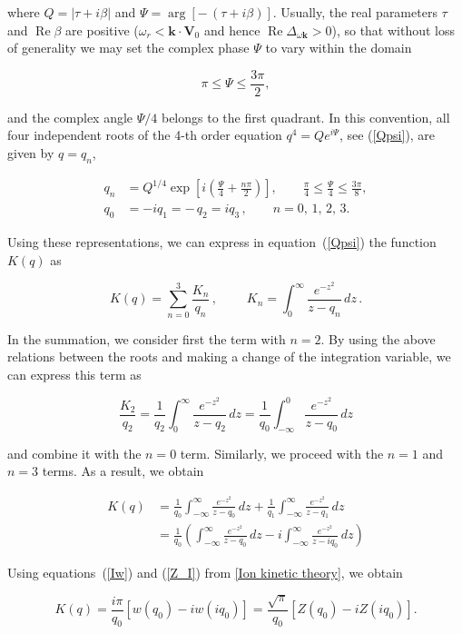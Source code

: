 \documentclass[draft]{agujournal2019}
\renewcommand{\vec}{\mathbf}
\begin{document}
where $Q=|\tau+i\beta| $ and $\Psi=\arg\left[-\,(
\tau+i\beta)\right]$. Usually, the real parameters $\tau$ and $\operatorname{Re}\beta$ 
are positive ($\omega_r < \vec{k}\cdot\vec{V}_0$ and hence $\operatorname{Re}\Delta_{\omega\vec{k}}>0$), so that without loss
of generality we may set the complex phase $\Psi$
to vary within the domain
\begin{linenomath*}
\begin{equation}
\pi\leq\Psi\leq\frac{3\pi}{2}, 
\label{quad}
\end{equation}
\end{linenomath*}
and the complex angle $\Psi/4$ belongs to the first quadrant. In this
convention, all four independent roots of the 4-th order equation $q^{4}=Qe^{i\Psi}$, see
(\ref{Qpsi}), are given by $q=q_n$,
\begin{linenomath*}
\begin{align}
q_{n}  &  =Q^{1/4}\exp\left[  i\left(  \frac{\Psi}{4}+\frac{n\pi}{2}\right)
\right]  ,\qquad\frac{\pi}{4}\leq\frac{\Psi}{4}\leq\frac{3\pi}{8},
\label{qn}\\
q_{0}  & = -iq_{1}= -\,q_{2}= iq_{3}\,, \qquad n=0,\,1,\,2,\,3. \nonumber
\end{align}
\end{linenomath*}
Using these representations, we can express in equation~(\ref{Qpsi}) the function $K(q)$ as
\begin{linenomath*}
\begin{equation}
K(q)=\sum_{n=0}^{3}\frac{K_{n}}{q_{n}}\,,\qquad\;K_{n}=\int
_{0}^{\infty}\frac{e^{-z^{2}}}{z-q_{n}}\,dz\,. \label{K(q)}
\end{equation}
\end{linenomath*}
In the summation, we consider first the term with $n=2$. By using the above
relations between the roots and making a change of the integration variable,
we can express this term as
\begin{linenomath*}
\[
\frac{K_{2}}{q_{2}}=\frac{1}{q_{2}}\int_{0}^{\infty}\frac{e^{-z^{2}}}{z-q_{2}%
}\,dz=\frac{1}{q_{0}}\int_{-\infty}^{0}\frac{e^{-z^{2}}}{z-q_{0}}\,dz
\]
\end{linenomath*}
and combine it with the $n=0$ term. Similarly, we proceed with the $n=1$ and $n=3$ terms. As a result, we obtain
\begin{linenomath*}
\begin{align*}
K(q)  &  =\frac{1}{q_{0}}\int_{-\infty}^{\infty}\frac{e^{-z^{2}}}{z-q_{0}%
}\,dz+\frac{1}{q_{1}}\int_{-\infty}^{\infty}\frac{e^{-z^{2}}}{z-q_{1}}\,dz\\
&  =\frac{1}{q_{0}}\left(  \int_{-\infty}^{\infty}\frac{e^{-z^{2}}}{z-q_{0}%
}\,dz-i\int_{-\infty}^{\infty}\frac{e^{-z^{2}}}{z-iq_{0}}\,dz\right)
\end{align*}
\end{linenomath*}
Using equations~(\ref{Iw}) and (\ref{Z_I}) from \ref{Ion kinetic theory}, we obtain
\begin{linenomath*}
\begin{equation}
K(q)=\frac{i\pi}{q_{0}}\left[  w(q_{0})-iw(iq_{0})\right]  = \frac
{\sqrt{\pi}}{q_{0}}\left[  Z(q_{0})-iZ(iq_{0})\right]  . 
\label{Kq}
\end{equation}
\end{linenomath*}
\end{document}
